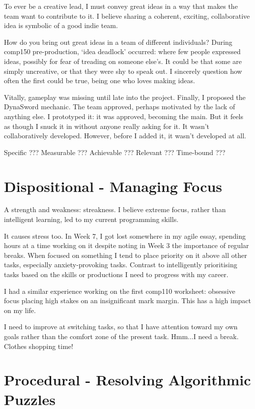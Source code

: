 \documentclass{scrartcl}
\begin{document}
To ever be a creative lead, I must convey great ideas in a way that makes the team want to contribute to it. I believe sharing a coherent, exciting, collaborative idea is symbolic of a good indie team.

How do you bring out great ideas in a team of different individuals? During comp150 pre-production, `idea deadlock' occurred: where few people expressed ideas, possibly for fear of treading on someone else's. It could be that some are simply uncreative, or that they were shy to speak out. I sincerely question how often the first could be true, being one who loves making ideas.

Vitally, gameplay was missing until late into the project. Finally, I proposed the DynaSword mechanic. The team approved, perhaps motivated by the lack of anything else. I prototyped it: it was approved, becoming the main. But it feels as though I snuck it in without anyone really asking for it. It wasn't collaboratively developed. However, before I added it, it wasn't developed at all.

Specific   ???
Measurable ???
Achievable ???
Relevant   ???
Time-bound ???

\section{Dispositional - Managing Focus}

A strength and weakness: streakness. I believe extreme focus, rather than intelligent learning, led to my current programming skills.

It causes stress too. In Week 7, I got lost somewhere in my agile essay, spending hours at a time working on it despite noting in Week 3 the importance of regular breaks. When focused on something I tend to place priority on it above all other tasks, especially anxiety-provoking tasks. Contrast to intelligently prioritising tasks based on the skills or productions I need to progress with my career.

I had a similar experience working on the first comp110 worksheet: obsessive focus placing high stakes on an insignificant mark margin. This has a high impact on my life.

I need to improve at switching tasks, so that I have attention toward my own goals rather than the comfort zone of the present task. Hmm...I need a break. Clothes shopping time!

\section{Procedural - Resolving Algorithmic Puzzles}
\end{document}
